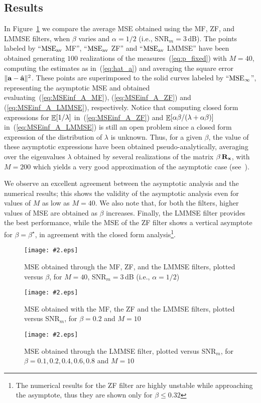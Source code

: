 \documentclass[final, a4paper]{IEEEtran}
\newcommand{\insertfig}[4]{
\begin{figure}[tbh]
\centerline{\texttt{[image: \#2.eps]}}
\vspace{-0.3cm}
\caption{#3}\label{#4}\end{figure}}
\newcommand{\av}{{\bf a}}
\newcommand{\xv}{{\bf x}}
\newcommand{\Rm}{{\bf R}}
\def\MSEav{{\rm MSE}_{\rm av}}
\def\MSEinf{{\rm MSE}_{\infty}}
\begin{document}
\subsection{Results}
In Figure~\ref{fig:MSE_model_A_0} we compare the average MSE obtained using
the MF, ZF, and LMMSE filters, when $\beta$ varies and $\alpha=1/2$ (i.e.,
SNR$_m=3$\,dB). The points labeled by ``$\MSEav$ MF'', ``$\MSEav$ ZF'' and ``$\MSEav$
LMMSE'' have been obtained generating $100$ realizations of the
measures~(\ref{eq:p_fixed}) with $M=40$, computing the estimates as
in~(\ref{eq:hat_a}) and averaging the square error $\|\av-\hat{\av}\|^2$.
These points are superimposed to the solid curves labeled by ``$\MSEinf$'',
representing the asymptotic MSE and obtained evaluating~(\ref{eq:MSEinf_A_MF}), (\ref{eq:MSEinf_A_ZF}) and
(\ref{eq:MSEinf_A_LMMSE}), respectively. Notice that computing closed
form expressions for $\mathop{\mathbb{E}}\limits[1/\lambda]$ in~(\ref{eq:MSEinf_A_ZF}) and
$\mathop{\mathbb{E}}\limits[\alpha\beta/(\lambda+\alpha\beta)]$ in~(\ref{eq:MSEinf_A_LMMSE}) is still
an open problem since a closed form expression of the distribution of $\lambda$ is unknown.
Thus, for a given $\beta$, the value of these
asymptotic expressions have been obtained pseudo-analytically, averaging over the
eigenvalues $\lambda$ obtained by several realizations of the matrix $\beta\,\Rm_\xv$, with $M=200$
which yields a very good approximation of the asymptotic case (see~\cite{NordioChiasseriniViterbo}).

We observe an excellent agreement between the asymptotic analysis
and the numerical results; this shows the validity of the asymptotic
analysis even for values of $M$ as low as $M=40$.
We also note that, for both the filters, higher values of MSE are obtained as $\beta$
increases. Finally, the LMMSE
filter provides the best performance, while the MSE of the ZF filter
shows a vertical asymptote for $\beta=\beta^\star$, in agreement
with the closed form analysis\footnote{The numerical results for the
ZF filter are highly unstable while approaching the asymptote, thus
they are shown only for $\beta \leq 0.32$}.

\insertfig{1.00}{MSE_model_A_0}{MSE obtained through the MF, ZF, and the LMMSE filters,
plotted versus $\beta$, for $M=40$, SNR$_m=3$\,dB (i.e., $\alpha=1/2$)}{fig:MSE_model_A_0}

\insertfig{1.00}{MSE_model_A_1}{MSE obtained with the MF, the ZF and the LMMSE filters,
plotted versus SNR$_m$, for $\beta=0.2$ and $M=10$}{fig:MSE_model_A_1}
\insertfig{1.00}{MSE_model_A_2}{MSE obtained through the LMMSE filter,
plotted versus SNR$_m$, for $\beta=0.1,0.2,0.4,0.6,0.8$ and $M=10$}{fig:MSE_model_A_2}
\end{document}
